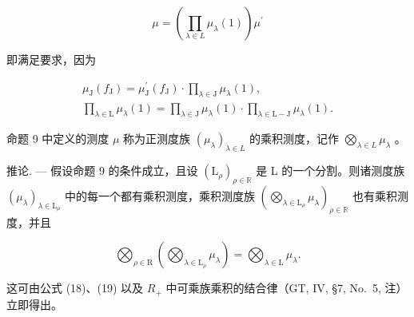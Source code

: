 \[
\mu = \left(\prod_ {\lambda \in L} \mu_ {\lambda} (1)\right) \mu^ {\prime}
\]

即满足要求，因为

\[
\begin{array}{c} \mu_ {\mathrm{J}} (f _ {\mathrm{J}}) = \mu_ {\mathrm{J}} ^ {\prime} (f _ {\mathrm{J}}) \cdot \prod_ {\lambda \in \mathrm{J}} \mu_ {\lambda} (1), \\ \prod_ {\lambda \in \mathrm{L}} \mu_ {\lambda} (1) = \prod_ {\lambda \in \mathrm{J}} \mu_ {\lambda} (1) \cdot \prod_ {\lambda \in \mathrm{L} - \mathrm{J}} \mu_ {\lambda} (1). \end{array}
\]

命题 9 中定义的测度 \(\mu\) 称为正测度族 \((\mu_{\lambda})_{\lambda \in L}\) 的乘积测度，记作 \(\bigotimes_{\lambda \in L} \mu_{\lambda}\) 。

推论. --- 假设命题 9 的条件成立，且设 \((\mathrm{L}_{\rho})_{\rho\in\mathbb{R}}\) 是 L 的一个分割。则诸测度族 \((\mu_{\lambda})_{\lambda\in\mathrm{L}_{\rho}}\) 中的每一个都有乘积测度，乘积测度族 \(\left(\bigotimes_{\lambda\in\mathrm{L}_{\rho}}\mu_{\lambda}\right)_{\rho\in\mathbb{R}}\) 也有乘积测度，并且

\[
\bigotimes_ {\rho \in \mathrm{R}} \left(\bigotimes_ {\lambda \in \mathrm{L} _ {\rho}} \mu_ {\lambda}\right) = \bigotimes_ {\lambda \in \mathrm{L}} \mu_ {\lambda}.\tag{20}
\]

这可由公式 (18)、(19) 以及 \(R_{+}\) 中可乘族乘积的结合律（GT, IV, §7, No.~5, 注）立即得出。

